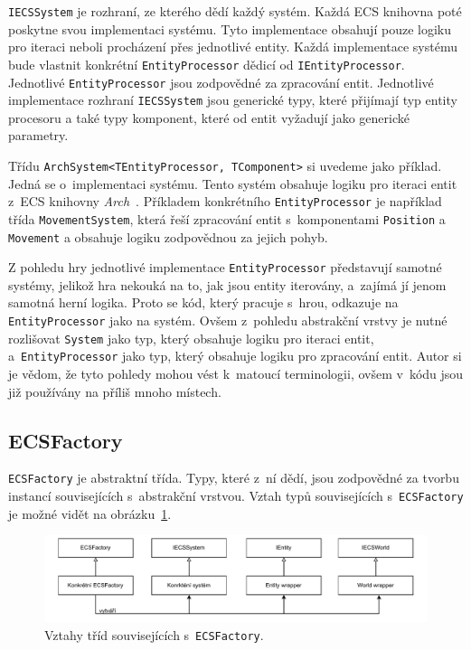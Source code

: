 \texttt{IECSSystem} je rozhraní, ze kterého dědí každý systém. Každá ECS knihovna poté poskytne svou implementaci systému. Tyto implementace obsahují pouze logiku pro iteraci neboli procházení přes jednotlivé entity. Každá implementace systému bude vlastnit konkrétní \texttt{EntityProcessor} dědicí od \texttt{IEntityProcessor}. Jednotlivé \texttt{EntityProcessor} jsou zodpovědné za zpracování entit. Jednotlivé implementace rozhraní \texttt{IECSSystem} jsou generické typy, které přijímají typ entity procesoru a také typy komponent, které od entit vyžadují jako generické parametry.

Třídu \texttt{ArchSystem<TEntityProcessor, TComponent>} si uvedeme jako příklad. Jedná se o~implementaci systému. Tento systém obsahuje logiku pro iteraci entit z~ECS knihovny \textit{Arch}~\cite{Arch}. Příkladem konkrétního \texttt{EntityProcessor} je například třída \texttt{MovementSystem}, která řeší zpracování entit s~komponentami \texttt{Position} a \texttt{Movement} a obsahuje logiku zodpovědnou za jejich pohyb.

Z pohledu hry jednotlivé implementace \texttt{EntityProcessor} představují samotné systémy, jelikož hra nekouká na to, jak jsou entity iterovány, a~zajímá jí jenom samotná herní logika. Proto se kód, který pracuje s~hrou, odkazuje na \texttt{EntityProcessor} jako na systém. Ovšem z~pohledu abstrakční vrstvy je nutné rozlišovat \texttt{System} jako typ, který obsahuje logiku pro iteraci entit, a~\texttt{EntityProcessor} jako typ, který obsahuje logiku pro zpracování entit. Autor si je vědom, že tyto pohledy mohou vést k~matoucí terminologii, ovšem v~kódu jsou již používány na příliš mnoho místech.

\subsection{ECSFactory}
\texttt{ECSFactory} je abstraktní třída. Typy, které z~ní dědí, jsou zodpovědné za tvorbu instancí souvisejících s~abstrakční vrstvou. Vztah typů souvisejících s~\texttt{ECSFactory} je možné vidět na obrázku~\ref{fig:abstract-layer-ecsfactory}.

\begin{figure}[!htb]
  \centering
  \includegraphics[width=1.0\linewidth]{img/abstract-layer-ecsfactory.pdf}
  \caption{Vztahy tříd souvisejících s~\texttt{ECSFactory}.}
  \label{fig:abstract-layer-ecsfactory}
\end{figure}

